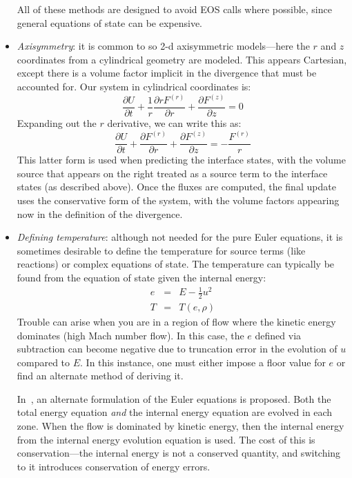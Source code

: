 \begin{itemize}
All of these methods are designed to avoid EOS calls where possible,
since general equations of state can be expensive.


\item {\em Axisymmetry}: it is common to so 2-d axisymmetric models---here
the $r$ and $z$ coordinates from a cylindrical geometry are modeled.  This
appears Cartesian, except there is a volume factor implicit in the 
divergence that must be accounted for.  Our system in cylindrical
coordinates is:
\begin{equation}
\frac{\partial U}{\partial t} 
  + \frac{1}{r}\frac{\partial r F^{(r)}}{\partial r} 
  + \frac{\partial F^{(z)}}{\partial z} = 0
\end{equation}
Expanding out the $r$ derivative, we can write this as:
\begin{equation}
\frac{\partial U}{\partial t} 
  + \frac{\partial F^{(r)}}{\partial r} 
  + \frac{\partial F^{(z)}}{\partial z} = -\frac{F^{(r)}}{r}
\end{equation}
This latter form is used when predicting the interface states, with
the volume source that appears on the right treated as a source term
to the interface states (as described above).  Once the fluxes are
computed, the final update uses the conservative form of the system,
with the volume factors appearing now in the definition of the
divergence.

\item {\em Defining temperature}: although not needed for the pure
  Euler equations, it is sometimes desirable to define the temperature
  for source terms (like reactions) or complex equations of state.
  The temperature can typically be found from the equation of state
  given the internal energy:
  \begin{eqnarray}
  e &=& E - \frac{1}{2} u^2 \\
  T &=& T(e, \rho)
  \end{eqnarray}
  Trouble can arise when you are in a region of flow where the kinetic
  energy dominates (high Mach number flow).  In this case, the $e$ defined
  via subtraction can become negative due to truncation error in the  
  evolution of $u$ compared to $E$.  In this instance, one must either
  impose a floor value for $e$ or find an alternate method of deriving
  it.

  In~\cite{bryan:1995}, an alternate formulation of the Euler equations
  is proposed.  Both the total energy equation {\em and} the internal
  energy equation are evolved in each zone.  When the flow is dominated
  by kinetic energy, then the internal energy from the internal energy
  evolution equation is used.  The cost of this is conservation---the 
  internal energy is not a conserved quantity, and switching to it 
  introduces conservation of energy errors.


\end{itemize}
